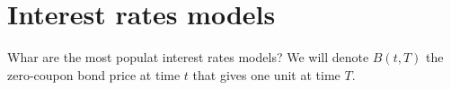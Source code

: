 \section{Interest rates models}

\begin{tcolorbox}[width=\linewidth, sharp corners=all, colback=white!95!black]
Whar are the most populat interest rates models? We will denote $B(t,T)$ the zero-coupon bond price at time $t$ that gives one unit at time $T$.
\end{tcolorbox}

